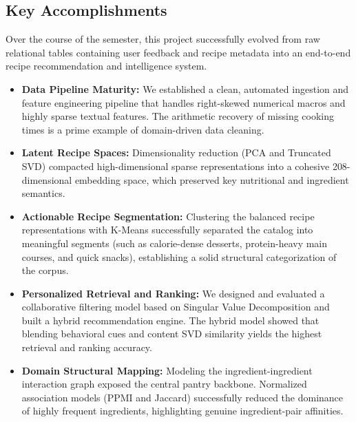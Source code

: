 \documentclass[11pt,a4paper]{article}
\begin{document}
\subsection{Key Accomplishments}
Over the course of the semester, this project successfully evolved from raw relational tables containing user feedback and recipe metadata into an end-to-end recipe recommendation and intelligence system. 
\begin{itemize}
    \item \textbf{Data Pipeline Maturity:} We established a clean, automated ingestion and feature engineering pipeline that handles right-skewed numerical macros and highly sparse textual features. The arithmetic recovery of missing cooking times is a prime example of domain-driven data cleaning.
    \item \textbf{Latent Recipe Spaces:} Dimensionality reduction (PCA and Truncated SVD) compacted high-dimensional sparse representations into a cohesive 208-dimensional embedding space, which preserved key nutritional and ingredient semantics.
    \item \textbf{Actionable Recipe Segmentation:} Clustering the balanced recipe representations with K-Means successfully separated the catalog into meaningful segments (such as calorie-dense desserts, protein-heavy main courses, and quick snacks), establishing a solid structural categorization of the corpus.
    \item \textbf{Personalized Retrieval and Ranking:} We designed and evaluated a collaborative filtering model based on Singular Value Decomposition and built a hybrid recommendation engine. The hybrid model showed that blending behavioral cues and content SVD similarity yields the highest retrieval and ranking accuracy.
    \item \textbf{Domain Structural Mapping:} Modeling the ingredient-ingredient interaction graph exposed the central pantry backbone. Normalized association models (PPMI and Jaccard) successfully reduced the dominance of highly frequent ingredients, highlighting genuine ingredient-pair affinities.
\end{itemize}
\end{document}
